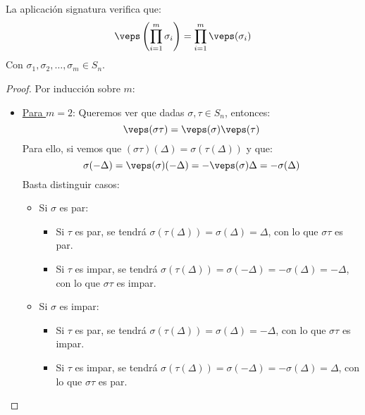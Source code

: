 \begin{prop}\label{prop:producto_signaturas}
    La aplicación signatura verifica que:
    \begin{equation*}
        \veps\left(\prod_{i=1}^{m}\sigma_i\right) = \prod_{i=1}^{m} \veps(\sigma_i)
    \end{equation*}
    Con $\sigma_1,\sigma_2,\ldots,\sigma_m\in S_n$.
    \begin{proof}
        Por inducción sobre $m$:
        \begin{itemize}
            \item \underline{Para $m=2$}: Queremos ver que dadas $\sigma,\tau\in S_n$, entonces:
                \begin{equation*}
                    \veps(\sigma\tau) = \veps(\sigma)\veps(\tau)
                \end{equation*}
                Para ello, si vemos que $(\sigma\tau)(\Delta) = \sigma(\tau(\Delta))$ y que:
                \begin{equation*}
                    \sigma(-\Delta) = \veps(\sigma)(-\Delta) = - \veps(\sigma)\Delta = -\sigma(\Delta)
                \end{equation*}
            Basta distinguir casos:
            \begin{itemize}
                \item Si $\sigma$ es par:
                    \begin{itemize}
                        \item Si $\tau$ es par, se tendrá $\sigma(\tau(\Delta)) = \sigma(\Delta)=\Delta$, con lo que $\sigma\tau$ es par.
                        \item Si $\tau$ es impar, se tendrá $\sigma(\tau(\Delta)) = \sigma(-\Delta)=-\sigma(\Delta)=-\Delta$, con lo que $\sigma\tau$ es impar.
                    \end{itemize}
                \item Si $\sigma$ es impar:
                    \begin{itemize}
                        \item Si $\tau$ es par, se tendrá $\sigma(\tau(\Delta)) = \sigma(\Delta) = -\Delta$, con lo que $\sigma\tau$ es impar.
                        \item Si $\tau$ es impar, se tendrá $\sigma(\tau(\Delta)) = \sigma(-\Delta)=-\sigma(\Delta)=\Delta$, con lo que $\sigma\tau$ es par.
                    \end{itemize}
            \end{itemize}

\end{itemize}
\end{proof}
\end{prop}

